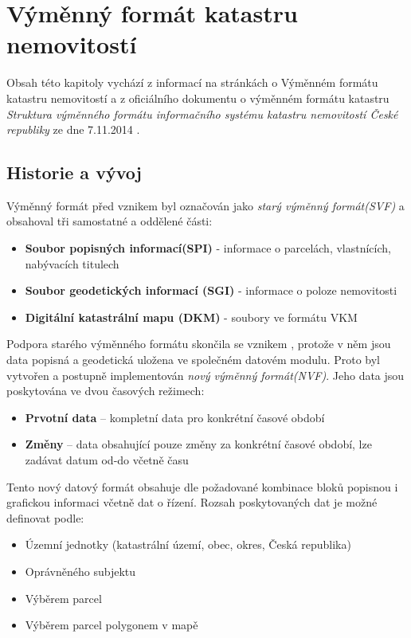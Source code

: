 \section{Výměnný formát katastru nemovitostí}
Obsah této kapitoly vychází z informací na stránkách  o
Výměnném formátu katastru nemovitostí a z oficiálního dokumentu o
výměnném formátu katastru \textit{Struktura výměnného formátu
  informačního systému katastru nemovitostí České republiky} ze dne
7.11.2014 \cite{struktura_ISKN}.
\subsection{Historie a vývoj}
Výměnný formát před vznikem  byl označován jako \textit{starý
  výměnný formát(SVF)} a obsahoval tři samostatné a oddělené části:
\begin{itemize}[leftmargin=50pt]
	\item \textbf{Soubor popisných informací(SPI)} - informace o parcelách, vlastnících, nabývacích titulech
	\item \textbf{Soubor geodetických informací (SGI)} - informace o poloze nemovitosti
	\item \textbf{Digitální katastrální mapu (DKM)} - soubory ve formátu VKM
\end{itemize}
Podpora starého výměnného formátu skončila se vznikem ,
protože v něm jsou data popisná a geodetická uložena ve společném
datovém modulu. Proto byl vytvořen a postupně implementován
\textit{nový výměnný formát(NVF)}. Jeho data jsou poskytována ve dvou
časových režimech:

\begin{itemize}[leftmargin=50pt]
\item \textbf{Prvotní data} -- kompletní data pro konkrétní časové období						
\item \textbf{Změny} -- data obsahující pouze změny za konkrétní časové období, lze zadávat datum od-do včetně času					 
\end{itemize}
Tento nový datový formát obsahuje dle požadované kombinace bloků
popisnou i grafickou informaci včetně dat o řízení. Rozsah
poskytovaných dat je možné definovat podle:

\begin{itemize}[leftmargin=50pt]
		\item Územní jednotky (katastrální území, obec, okres, Česká republika)
		\item Oprávněného subjektu
		\item Výběrem parcel
		\item Výběrem parcel polygonem v mapě
\end{itemize}
